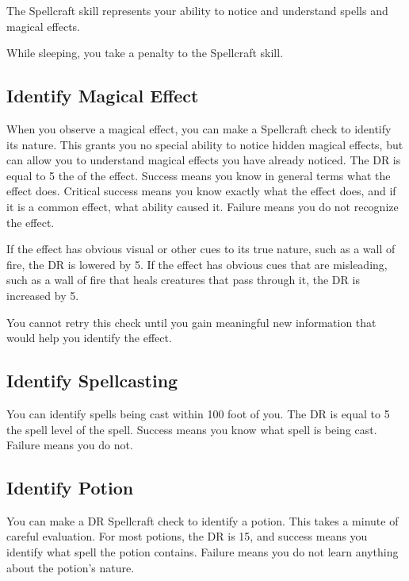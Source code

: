 \newpage
{}
        The Spellcraft skill represents your ability to notice and understand spells and magical effects.

        While sleeping, you take a  penalty to the Spellcraft skill.


    \subsection{Identify Magical Effect}
        When you observe a magical effect, you can make a Spellcraft check to identify its nature.
        This grants you no special ability to notice hidden magical effects, but can allow you to understand magical effects you have already noticed.
        The DR is equal to 5 \add the  of the effect.
        Success means you know in general terms what the effect does.
        Critical success means you know exactly what the effect does, and if it is a common effect, what ability caused it.
        Failure means you do not recognize the effect.

        If the effect has obvious visual or other cues to its true nature, such as a wall of fire, the DR is lowered by 5.
        If the effect has obvious cues that are misleading, such as a wall of fire that heals creatures that pass through it, the DR is increased by 5.

        You cannot retry this check until you gain meaningful new information that would help you identify the effect.

    \subsection{Identify Spellcasting}
        You can identify spells being cast within 100 foot  of you.
        The DR is equal to 5 \add the spell level of the spell.
        Success means you know what spell is being cast.
        Failure means you do not.

    \subsection{Identify Potion}
        You can make a DR Spellcraft check to identify a potion.
        This takes a minute of careful evaluation.
        For most potions, the DR is 15, and success means you identify what spell the potion contains.
        Failure means you do not learn anything about the potion's nature.

